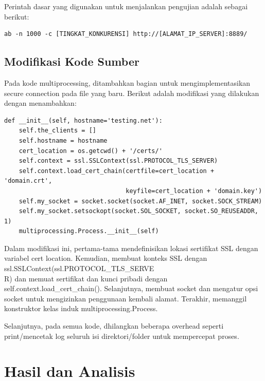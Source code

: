 \documentclass[12pt]{article}
\begin{document}
Perintah dasar yang digunakan untuk menjalankan pengujian adalah sebagai berikut:

\begin{verbatim}
ab -n 1000 -c [TINGKAT_KONKURENSI] http://[ALAMAT_IP_SERVER]:8889/
\end{verbatim}

\subsection{Modifikasi Kode Sumber}

Pada kode multiprocessing, ditambahkan bagian untuk mengimplementasikan secure connection pada file yang baru. Berikut adalah modifikasi yang dilakukan dengan menambahkan:

\begin{verbatim}
def __init__(self, hostname='testing.net'):
    self.the_clients = []
    self.hostname = hostname
    cert_location = os.getcwd() + '/certs/'
    self.context = ssl.SSLContext(ssl.PROTOCOL_TLS_SERVER)
    self.context.load_cert_chain(certfile=cert_location + 'domain.crt',
                                 keyfile=cert_location + 'domain.key')
    self.my_socket = socket.socket(socket.AF_INET, socket.SOCK_STREAM)
    self.my_socket.setsockopt(socket.SOL_SOCKET, socket.SO_REUSEADDR, 1)
    multiprocessing.Process.__init__(self)
\end{verbatim}

Dalam modifikasi ini, pertama-tama mendefinisikan lokasi sertifikat SSL dengan variabel cert location. Kemudian, membuat konteks SSL dengan ssl.SSLContext(ssl.PROTOCOL\_TLS\_SERVE\\R) dan memuat sertifikat dan kunci pribadi dengan self.context.load\_cert\_chain(). Selanjutnya, membuat socket dan mengatur opsi socket untuk mengizinkan penggunaan kembali alamat. Terakhir, memanggil konstruktor kelas induk multiprocessing.Process.

Selanjutnya, pada semua kode, dhilangkan beberapa overhead seperti print/mencetak log seluruh isi direktori/folder untuk mempercepat proses.



\newpage
\section{Hasil dan Analisis}
\end{document}

